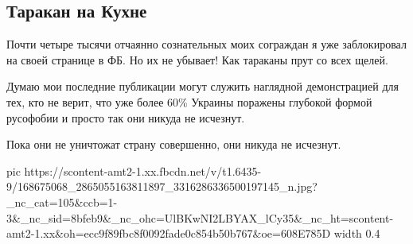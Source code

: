  
 
 
 
 

\subsection{Таракан на Кухне}

Почти четыре тысячи отчаянно сознательных моих сограждан я уже заблокировал на
своей странице в ФБ. Но их не убывает! Как тараканы прут со всех щелей.

Думаю мои последние публикации могут служить наглядной демонстрацией для тех,
кто не верит, что уже более 60\% Украины поражены глубокой формой русофобии и
просто так они никуда не исчезнут. 

Пока они не уничтожат страну совершенно, они никуда не исчезнут.

\ifcmt
  pic https://scontent-amt2-1.xx.fbcdn.net/v/t1.6435-9/168675068_2865055163811897_3316286336500197145_n.jpg?_nc_cat=105&ccb=1-3&_nc_sid=8bfeb9&_nc_ohc=UlBKwNI2LBYAX_lCy35&_nc_ht=scontent-amt2-1.xx&oh=ecc9f89fbc8f0092fade0c854b50b767&oe=608E785D
  width 0.4
\fi

